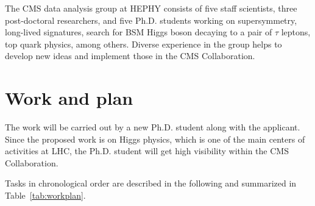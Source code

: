 \documentclass[a4paper,11pt]{article}
\begin{document}
The CMS data analysis group at HEPHY consists of five staff scientists, three post-doctoral researchers, and five Ph.D. students working on supersymmetry, long-lived signatures, search for BSM Higgs boson decaying to a pair of $\tau$ leptons, top quark physics, among others. 
Diverse experience in the group helps to develop new ideas and implement those in the CMS Collaboration.

\section{Work and plan}

The work will be carried out by a new Ph.D. student along with the applicant. 
Since the proposed work is on Higgs physics, which is one of the main centers of activities at LHC, the  
Ph.D. student will get high visibility within the CMS Collaboration.  

Tasks in chronological order are described in the following and summarized in Table~\ref{tab:workplan}.%
\end{document}
